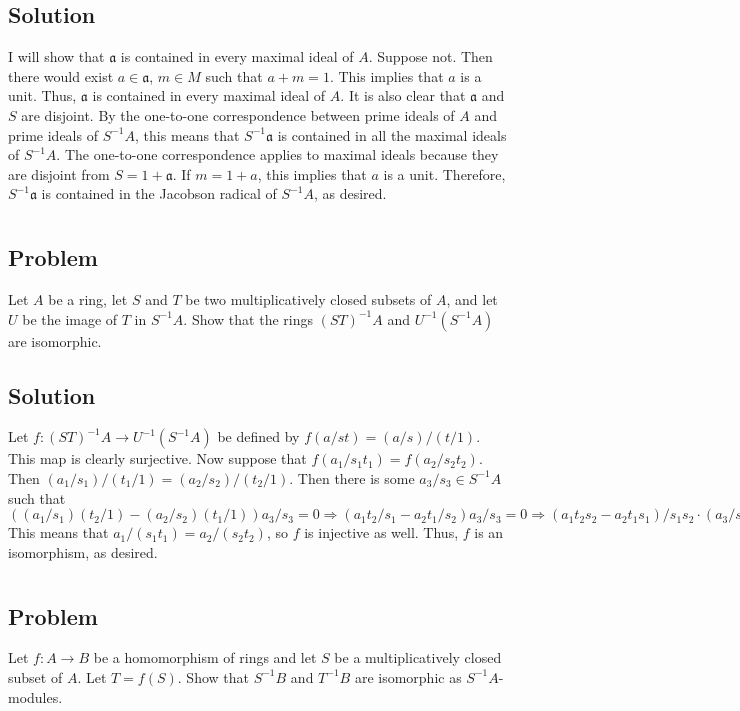 \documentclass[book,12pt,oneside,openany]{memoir}
\begin{document}
\subsection{Solution}
I will show that $\mathfrak{a}$ is contained in every maximal ideal of $A$. Suppose not. Then there would exist $a \in \mathfrak{a}$, $m \in M$ such that $a + m = 1$. This implies that $a$ is a unit. Thus, $\mathfrak{a}$ is contained in every maximal ideal of $A$. It is also clear that $\mathfrak{a}$ and $S$ are disjoint. By the one-to-one correspondence between prime ideals of $A$ and prime ideals of $S^{-1}A$, this means that $S^{-1}\mathfrak{a}$ is contained in all the maximal ideals of $S^{-1}A$. The one-to-one correspondence applies to maximal ideals because they are disjoint from $S = 1 + \mathfrak{a}$. If $m = 1 + a$, this implies that $a$ is a unit. Therefore, $S^{-1}\mathfrak{a}$ is contained in the Jacobson radical of $S^{-1}A$, as desired.


\section{}
\subsection{Problem}
Let $A$ be a ring, let $S$ and $T$ be two multiplicatively closed subsets of $A$, and let $U$ be the image of $T$ in $S^{-1}A$. Show that the rings $(ST)^{-1}A$ and $U^{-1}(S^{-1}A)$ are isomorphic.

\subsection{Solution}
Let $f: (ST)^{-1}A \rightarrow U^{-1}(S^{-1}A)$ be defined by $f(a/st) = (a/s)/(t/1)$. This map is clearly surjective. Now suppose that $f(a_1/s_1t_1) = f(a_2/s_2t_2)$. Then $(a_1/s_1)/(t_1/1) = (a_2/s_2)/(t_2/1)$. Then there is some $a_3/s_3 \in S^{-1}A$ such that $((a_1/s_1)(t_2/1) - (a_2/s_2)(t_1/1))a_3/s_3 = 0 \Rightarrow (a_1 t_2/s_1 - a_2 t_1/s_2)a_3/s_3 = 0 \Rightarrow (a_1t_2s_2 - a_2 t_1s_1)/s_1 s_2 \cdot (a_3/s_3) = 0 \Rightarrow a_1t_2s_2a_3 - a_2 t_1 s_1 a_3 = 0 $ This means that $a_1/(s_1t_1) = a_2/(s_2t_2)$, so $f$ is injective as well. Thus, $f$ is an isomorphism, as desired.

\section{}
\subsection{Problem}
Let $f: A \rightarrow B$ be a homomorphism of rings and let $S$ be a multiplicatively closed subset of $A$. Let $T = f(S)$. Show that $S^{-1}B$ and $T^{-1}B$ are isomorphic as $S^{-1}A$-modules.
\end{document}
